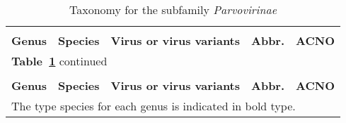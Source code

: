   








 



\clearpage



\begin{tiny}
\begin{center}

\begin{longtable}{p{0.7in} p{1.65in} p{1.6in} p{0.6in} p{0.65in}}
\caption[Taxonomy for the subfamily \textit{Parvovirinae}]{Taxonomy for the subfamily \textit{Parvovirinae}}\\
\\
\label{Tab: Taxonomy}
\textbf{Genus} & \textbf{Species} & \textbf{Virus or virus variants} & \textbf{Abbr.} & \textbf{ACNO}\footnotemark\\
\hline
\endfirsthead %

\multicolumn{3}{l}{\normalsize\textbf{Table~\ref{Tab: Taxonomy}} continued}\\
\\
\textbf{Genus} & \textbf{Species} & \textbf{Virus or virus variants} & \textbf{Abbr.} & \textbf{ACNO}\\
\hline
\endhead

\hline
\multicolumn{5}{l}{The type species for each genus is indicated in bold type. \cite{pmid24212889}}
\endlastfoot


\end{longtable}
\end{center}
\end{tiny}
